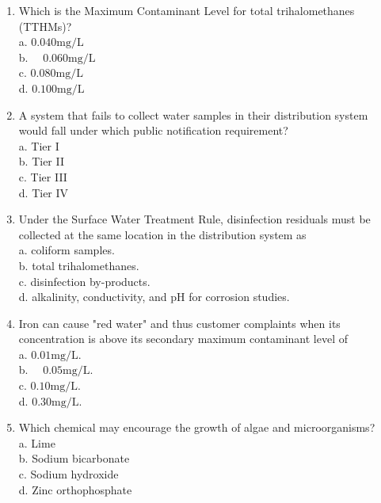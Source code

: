 \documentclass[10pt]{article}
\begin{document}
\begin{enumerate}
  \item Which is the Maximum Contaminant Level for total trihalomethanes (TTHMs)?\\
a. $0.040 \mathrm{mg} / \mathrm{L}$\\
b. $\quad 0.060 \mathrm{mg} / \mathrm{L}$\\
c. $0.080 \mathrm{mg} / \mathrm{L}$\\
d. $0.100 \mathrm{mg} / \mathrm{L}$ 

\item A system that fails to collect water samples in their distribution system would fall under which public notification requirement?\\
a. Tier I\\
b. Tier II\\
c. Tier III\\
d. Tier IV

  \item Under the Surface Water Treatment Rule, disinfection residuals must be collected at the same location in the distribution system as\\
a. coliform samples.\\
b. total trihalomethanes.\\
c. disinfection by-products.\\
d. alkalinity, conductivity, and $\mathrm{pH}$ for corrosion studies.

  \item Iron can cause "red water" and thus customer complaints when its concentration is above its secondary maximum contaminant level of\\
a. $0.01 \mathrm{mg} / \mathrm{L}$.\\
b. $\quad 0.05 \mathrm{mg} / \mathrm{L}$.\\
c. $0.10 \mathrm{mg} / \mathrm{L}$.\\
d. $0.30 \mathrm{mg} / \mathrm{L}$.

  \item Which chemical may encourage the growth of algae and microorganisms?\\
a. Lime\\
b. Sodium bicarbonate\\
c. Sodium hydroxide\\
d. Zinc orthophosphate

















\end{enumerate}
\end{document}
